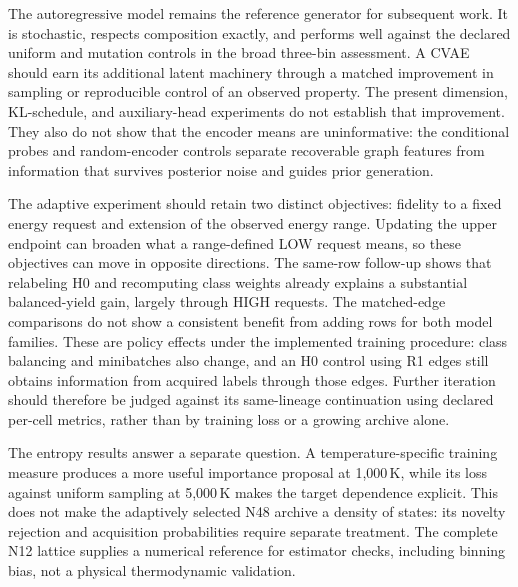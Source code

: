 The autoregressive model remains the reference generator for subsequent
work. It is stochastic, respects composition exactly, and performs well
against the declared uniform and mutation controls in the broad three-bin
assessment. A CVAE should earn its additional latent machinery through a
matched improvement in sampling or reproducible control of an observed
property. The present dimension, KL-schedule, and auxiliary-head experiments
do not establish that improvement. They also do not show that the encoder
means are uninformative: the conditional probes and random-encoder controls
separate recoverable graph features from information that survives posterior
noise and guides prior generation.

The adaptive experiment should retain two distinct objectives: fidelity to
a fixed energy request and extension of the observed energy range. Updating
the upper endpoint can broaden what a range-defined LOW request means, so
these objectives can move in opposite directions. The same-row follow-up
shows that relabeling H0 and recomputing class weights already explains a
substantial balanced-yield gain, largely through HIGH requests. The
matched-edge comparisons do not show a consistent benefit from adding rows
for both model families. These are policy effects under the implemented
training procedure: class balancing and minibatches also change, and an H0
control using R1 edges still obtains information from acquired labels through
those edges. Further iteration should therefore be judged against its
same-lineage continuation using declared per-cell metrics, rather than by
training loss or a growing archive alone.

The entropy results answer a separate question. A temperature-specific
training measure produces a more useful importance proposal at 1,000\,K,
while its loss against uniform sampling at 5,000\,K makes the target
dependence explicit. This does not make the adaptively selected N48 archive
a density of states: its novelty rejection and acquisition probabilities
require separate treatment. The complete N12 lattice supplies a numerical
reference for estimator checks, including binning bias, not a physical
thermodynamic validation.

